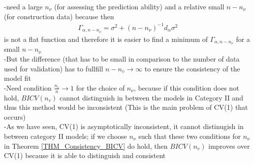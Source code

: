 \documentclass[Research_Module_ES.tex]{subfiles}
\begin{document}
-need a large $n_\nu$ (for assessing the prediction ability) and a relative small $n-n_\nu$ (for construction data) because then
\begin{align*}
	\Gamma_{\alpha,n-n_\nu}=\sigma^2+(n-n_\nu)^{-1}d_\alpha\sigma^2
\end{align*}
is not a flat function and therefore it is easier to find a minimum of $\Gamma_{\alpha,n-n_\nu}$ for a small $n-n_\nu$\\
-But the difference (that has to be small in comparison to the number of data used for validation) has to fullfill $n-n_v \to \infty$ to ensure the consistency of the model fit\\
-Need condition $\frac{n_v}{n}\to 1$ for the choice of $n_\nu$, because if this condition does not hold, $BICV(n_v)$ cannot distinguish in between the models in Category II and thus this method would be inconsistent (This is the main problem of CV(1) that occurs)\\
-As we have seen, CV(1) is asymptotically inconsistent, it cannot distinugish in between category II models; if we choose $n_\nu$ such that these two conditions for $n_\nu$ in Theorem \ref{THM_Consistency_BICV} do hold, then $BICV(n_v)$ improves over CV(1) because it is able to distinguish and consistent
\end{document}
